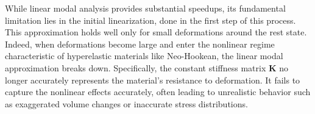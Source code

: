 While linear modal analysis provides substantial speedups, its fundamental limitation lies in the initial linearization, done in the first step of this process. This approximation holds well only for small deformations around the rest state. Indeed, when deformations become large and enter the nonlinear regime characteristic of hyperelastic materials like Neo-Hookean, the linear modal approximation breaks down. Specifically, the constant stiffness matrix $\bm{K}$ no longer accurately represents the material's resistance to deformation. It fails to capture the nonlinear effects accurately, often leading to unrealistic behavior such as exaggerated volume changes or inaccurate stress distributions.

